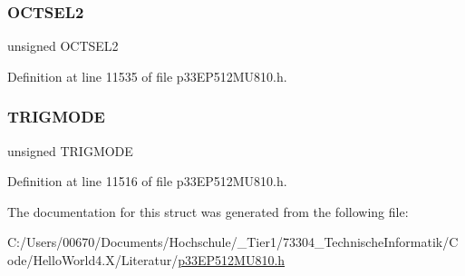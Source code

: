 \subsubsection{\texorpdfstring{O\+C\+T\+S\+E\+L2}{OCTSEL2}}
{\footnotesize\ttfamily unsigned O\+C\+T\+S\+E\+L2}



Definition at line 11535 of file p33\+E\+P512\+M\+U810.\+h.

\mbox{\label{structtag_o_c7_c_o_n1_b_i_t_s_a7a0057e0dca6e2663584b5b9e1da04c3}} 
\subsubsection{\texorpdfstring{T\+R\+I\+G\+M\+O\+DE}{TRIGMODE}}
{\footnotesize\ttfamily unsigned T\+R\+I\+G\+M\+O\+DE}



Definition at line 11516 of file p33\+E\+P512\+M\+U810.\+h.



The documentation for this struct was generated from the following file\+:\begin{DoxyCompactItemize}
\item 
C\+:/\+Users/00670/\+Documents/\+Hochschule/\+\_\+\+Tier1/73304\+\_\+\+Technische\+Informatik/\+Code/\+Hello\+World4.\+X/\+Literatur/\hyperlink{p33_e_p512_m_u810_8h}{p33\+E\+P512\+M\+U810.\+h}\end{DoxyCompactItemize}
